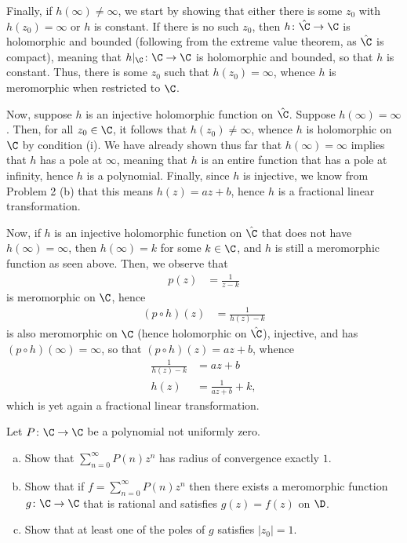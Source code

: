 \documentclass[10pt]{mypackage}
\begin{document}
\begin{solution}
  Finally, if $h\left( \infty \right)\neq \infty$, we start by showing that either there is some $z_0$ with $h\left( z_0 \right) = \infty$ or $h$ is constant. If there is no such $z_0$, then $h\colon \hat{\C}\rightarrow \C$ is holomorphic and bounded (following from the extreme value theorem, as $\hat{\C}$ is compact), meaning that $h|_{\C}\colon \C\rightarrow \C$ is holomorphic and bounded, so that $h$ is constant. Thus, there is some $z_0$ such that $h\left( z_0 \right) = \infty$, whence $h$ is meromorphic when restricted to $\C$.\newline

  Now, suppose $h$ is an injective holomorphic function on $\hat{\C}$. Suppose $h\left( \infty \right) = \infty$. Then, for all $z_0\in \C$, it follows that $h\left( z_0 \right)\neq \infty$, whence $h$ is holomorphic on $\C$ by condition (i). We have already shown thus far that $h\left( \infty \right) = \infty$ implies that $h$ has a pole at $\infty$, meaning that $h$ is an entire function that has a pole at infinity, hence $h$ is a polynomial. Finally, since $h$ is injective, we know from Problem 2 (b) that this means $h\left( z \right) = az + b$, hence $h$ is a fractional linear transformation.\newline

  Now, if $h$ is an injective holomorphic function on $\hat{\C}$ that does not have $h\left( \infty \right) = \infty$, then $h\left( \infty \right) = k$ for some $k\in \C$, and $h$ is still a meromorphic function as seen above. Then, we observe that
  \begin{align*}
    p(z) &= \frac{1}{z-k}
  \end{align*}
  is meromorphic on $\C$, hence
  \begin{align*}
    \left( p\circ h \right)(z) &= \frac{1}{h(z) - k}
  \end{align*}
  is also meromorphic on $\C$ (hence holomorphic on $\hat{\C}$), injective, and has $\left( p\circ h \right)\left( \infty \right) = \infty$, so that $\left( p\circ h \right)\left( z \right) = az + b$, whence
  \begin{align*}
    \frac{1}{h\left( z \right)-k} &= az + b\\
    h\left( z \right) &= \frac{1}{az + b} + k,
  \end{align*}
  which is yet again a fractional linear transformation.
\end{solution}
\begin{problem}[Problem 4]
  Let $P\colon \C\rightarrow \C$ be a polynomial not uniformly zero.
  \begin{enumerate}[(a)]
    \item Show that $\sum_{n=0}^{\infty}P(n)z^{n}$ has radius of convergence exactly $1$.
    \item Show that if $f = \sum_{n=0}^{\infty}P(n)z^{n}$ then there exists a meromorphic function $g\colon \C\rightarrow \C$ that is rational and satisfies $g(z) = f(z)$ on $\D$.
    \item Show that at least one of the poles of $g$ satisfies $\left\vert z_0 \right\vert = 1$.
  \end{enumerate}
\end{problem}
\end{document}
